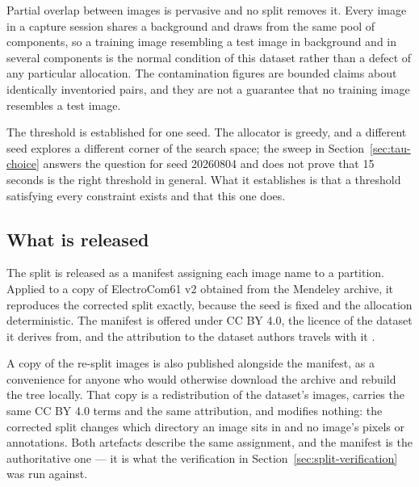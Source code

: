 Partial overlap between images is pervasive and no split removes it. Every image
in a capture session shares a background and draws from the same pool of
components, so a training image resembling a test image in background and in
several components is the normal condition of this dataset rather than a defect
of any particular allocation. The contamination figures are bounded claims about
identically inventoried pairs, and they are not a guarantee that no training
image resembles a test image.

The threshold is established for one seed. The allocator is greedy, and a
different seed explores a different corner of the search space; the sweep in
Section~\ref{sec:tau-choice} answers the question for seed 20260804 and does not
prove that 15 seconds is the right threshold in general. What it establishes is
that a threshold satisfying every constraint exists and that this one does.

\subsection{What is released}
\label{sec:split-release}

The split is released as a manifest assigning each image name to a partition.
Applied to a copy of ElectroCom61 v2 obtained from the Mendeley archive, it
reproduces the corrected split exactly, because the seed is fixed and the
allocation deterministic. The manifest is offered under CC BY 4.0, the licence
of the dataset it derives from, and the attribution to the dataset authors
travels with it \citep{electrocom61}.

A copy of the re-split images is also published alongside the manifest, as a
convenience for anyone who would otherwise download the archive and rebuild the
tree locally. That copy is a redistribution of the dataset's images, carries the
same CC BY 4.0 terms and the same attribution, and modifies nothing: the
corrected split changes which directory an image sits in and no image's pixels
or annotations. Both artefacts describe the same assignment, and the manifest is
the authoritative one --- it is what the verification in
Section~\ref{sec:split-verification} was run against.
